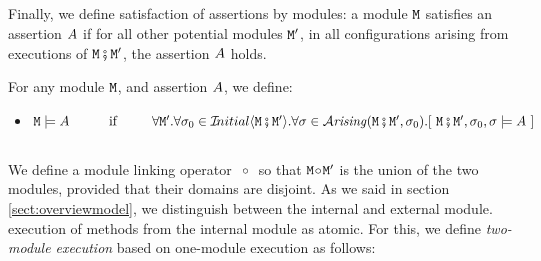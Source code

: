\subsection{}

Finally, we define satisfaction of assertions by modules: a module
${\mbox{\tt{\ensuremath{{\mbox{\tt{M}}}}}}}$ satisfies an assertion $A$ if for all other potential modules ${\mbox{\tt{\ensuremath{{\mbox{\tt{M}}}}}}}'$, in all configurations arising from executions of ${\mbox{\tt{\ensuremath{{\mbox{\tt{M}}}}}}}\fatsemi{\mbox{\tt{\ensuremath{{\mbox{\tt{M}}}}}}}'$, the assertion $A$ holds.

\begin{definition}
\label{def:module_satisfies}
For any module ${\mbox{\tt{\ensuremath{{\mbox{\tt{M}}}}}}}$, and  assertion $A$, we define:
\begin{itemize}
\item
$\M \models \A \ \ \  \ \ \ \ \ \mbox{
if               } \ \ \  \ \ \  \  \forall \M'.\forall \sigma_0 \in \Initial{\M \mkpair \M'}.\forall\sigma\in\Arising{\M \mkpair  {\M'}, \sigma_0}. [\ \M \mkpair  {\M'}, \sigma_0 , \sigma \models \A\ ]$
\end{itemize}
\end{definition}
  
  

\subsection{}

We define a module linking operator \  $\!\circ\!$ \  so that
${\mbox{\tt{\ensuremath{{\mbox{\tt{M}}}}}}}\!\circ\!{\mbox{\tt{\ensuremath{{\mbox{\tt{M}}}}}}}'$ is the union of the two modules, provided that their domains are disjoint.
As we said in section \ref{sect:overviewmodel}, we distinguish  between the internal and external module.   execution of 
methods from the internal module as atomic. For this, we define \emph{two-module execution}  based on
one-module execution as follows:

